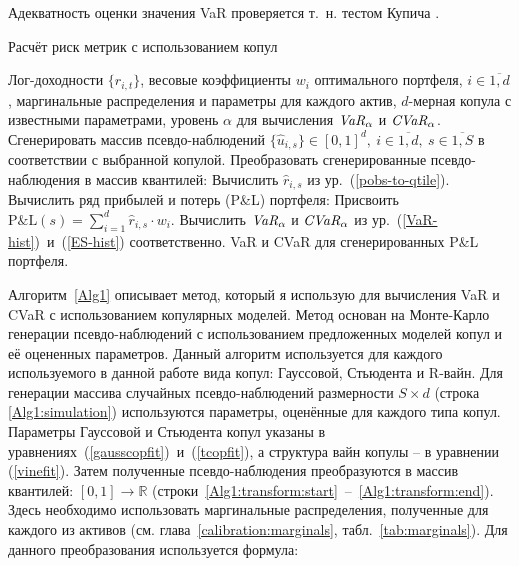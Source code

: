 Адекватность оценки значения VaR проверяется т.~н. тестом Купича \cite{Kupiec95}.

\begin{algorithm}[t]
\caption{Расчёт риск метрик с использованием копул}
\label{Alg1}
\begin{algorithmic}[1]
	\Require Лог-доходности $\{r_{i,t}\}$, весовые коэффициенты $w_i$ оптимального портфеля, $i \in \overline{1,d}$, маргинальные распределения и параметры для каждого актив, $d$-мерная копула с известными параметрами, уровень $\alpha$ для вычисления $\emph{VaR}_\alpha$ и $\emph{CVaR}_\alpha$.
	\label{Alg1:input}
	\State Сгенерировать массив псевдо-наблюдений 
	$\{\hat{u}_{i,s}\} \in [0, 1]^d, \ i \in \overline{1,d}, \ s \in \overline{1, S}$ 
	в соответствии с выбранной копулой.\label{Alg1:simulation}
	\State Преобразовать сгенерированные псевдо-наблюдения в массив квантилей:
	\label{Alg1:transform:start}
	        \State Вычислить $\hat{r}_{i,s}$ из ур.~(\ref{pobs-to-qtile}). \label{Alg1:transform}
	    \EndFor
	\EndFor \label{Alg1:transform:end}
	\State Вычислить ряд прибылей и потерь (P\&L) портфеля:
	\State Присвоить $\text{P\&L}(s) = \sum_{i=1}^d \hat{r}_{i,s} \cdot w_i$. \label{Alg1:PnL}
	\EndFor
	\State Вычислить $\emph{VaR}_\alpha$ и $\emph{CVaR}_\alpha$ из ур.~(\ref{VaR-hist})~и~(\ref{ES-hist}) соответственно. \label{Alg1:risk-measures}
	\Ensure VaR и CVaR для сгенерированных P\&L портфеля.
\end{algorithmic}
\end{algorithm}

Алгоритм~\ref{Alg1} описывает метод, который я использую для вычисления VaR и CVaR с использованием копулярных моделей.
Метод основан на Монте-Карло генерации псевдо-наблюдений с использованием предложенных моделей копул и её оцененных параметров.
Данный алгоритм используется для каждого используемого в данной работе вида копул: Гауссовой, Стьюдента и R-вайн.
Для генерации массива случайных псевдо-наблюдений размерности $S \times d$ (строка \ref{Alg1:simulation}) используются параметры, оценённые для каждого типа копул.
Параметры Гауссовой и Стьюдента копул указаны в уравнениях~(\ref{gausscopfit})~и~(\ref{tcopfit}), а структура вайн копулы -- в уравнении (\ref{vinefit}).
Затем полученные псевдо-наблюдения преобразуются в массив квантилей: $[0,1] \to \mathbb{R}$ (строки~\ref{Alg1:transform:start}~--~\ref{Alg1:transform:end}). Здесь необходимо использовать маргинальные распределения, полученные для каждого из активов (см. глава~\ref{calibration:marginals}, табл.~\ref{tab:marginals}).
Для данного преобразования используется формула:

